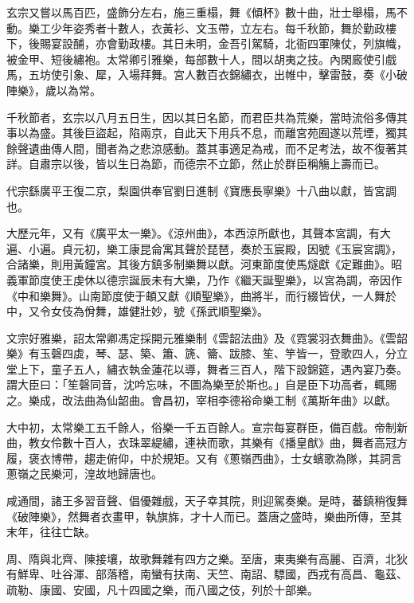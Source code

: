 \begin{pinyinscope}
 玄宗又嘗以馬百匹，盛飾分左右，施三重榻，舞《傾杯》數十曲，壯士舉榻，馬不動。樂工少年姿秀者十數人，衣黃衫、文玉帶，立左右。每千秋節，舞於勤政樓下，後賜宴設酺，亦會勤政樓。其日未明，金吾引駕騎，北衙四軍陳仗，列旗幟，被金甲、短後繡袍。太常卿引雅樂，每部數十人，間以胡夷之技。內閑廄使引戲馬，五坊使引象、犀，入場拜舞。宮人數百衣錦繡衣，出帷中，擊雷鼓，奏《小破陣樂》，歲以為常。



 千秋節者，玄宗以八月五日生，因以其日名節，而君臣共為荒樂，當時流俗多傳其事以為盛。其後巨盜起，陷兩京，自此天下用兵不息，而離宮苑囿遂以荒堙，獨其餘聲遺曲傳人間，聞者為之悲涼感動。蓋其事適足為戒，而不足考法，故不復著其詳。自肅宗以後，皆以生日為節，而德宗不立節，然止於群臣稱觴上壽而已。



 代宗繇廣平王復二京，梨園供奉官劉日進制《寶應長寧樂》十八曲以獻，皆宮調也。



 大歷元年，又有《廣平太一樂》。《涼州曲》，本西涼所獻也，其聲本宮調，有大遍、小遍。貞元初，樂工康昆侖寓其聲於琵琶，奏於玉宸殿，因號《玉宸宮調》，合諸樂，則用黃鐘宮。其後方鎮多制樂舞以獻。河東節度使馬燧獻《定難曲》。昭義軍節度使王虔休以德宗誕辰未有大樂，乃作《繼天誕聖樂》，以宮為調，帝因作《中和樂舞》。山南節度使于頔又獻《順聖樂》，曲將半，而行綴皆伏，一人舞於中，又令女伎為佾舞，雄健壯妙，號《孫武順聖樂》。



 文宗好雅樂，詔太常卿馮定採開元雅樂制《雲韶法曲》及《霓裳羽衣舞曲》。《雲韶樂》有玉磬四虡，琴、瑟、築、簫、篪、籥、跋膝、笙、竽皆一，登歌四人，分立堂上下，童子五人，繡衣執金蓮花以導，舞者三百人，階下設錦筵，遇內宴乃奏。謂大臣曰：「笙磬同音，沈吟忘味，不圖為樂至於斯也。」自是臣下功高者，輒賜之。樂成，改法曲為仙韶曲。會昌初，宰相李德裕命樂工制《萬斯年曲》以獻。



 大中初，太常樂工五千餘人，俗樂一千五百餘人。宣宗每宴群臣，備百戲。帝制新曲，教女伶數十百人，衣珠翠緹繡，連袂而歌，其樂有《播皇猷》曲，舞者高冠方履，褒衣博帶，趨走俯仰，中於規矩。又有《蔥嶺西曲》，士女蠙歌為隊，其詞言蔥嶺之民樂河，湟故地歸唐也。



 咸通間，諸王多習音聲、倡優雜戲，天子幸其院，則迎駕奏樂。是時，蕃鎮稍復舞《破陣樂》，然舞者衣畫甲，執旗旆，才十人而已。蓋唐之盛時，樂曲所傳，至其末年，往往亡缺。



 周、隋與北齊、陳接壤，故歌舞雜有四方之樂。至唐，東夷樂有高麗、百濟，北狄有鮮卑、吐谷渾、部落稽，南蠻有扶南、天竺、南詔、驃國，西戎有高昌、龜茲、疏勒、康國、安國，凡十四國之樂，而八國之伎，列於十部樂。




\end{pinyinscope}
